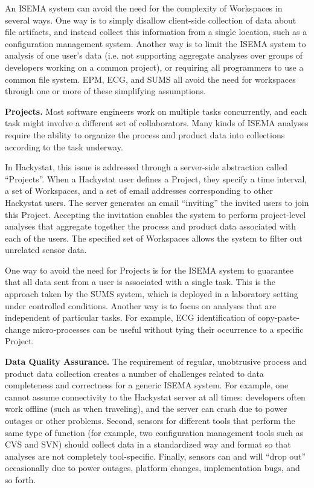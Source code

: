 \documentclass[10pt,twocolumn]{article}
\begin{document}
An ISEMA system can avoid the need for the complexity of Workspaces in
several ways.  One way is to simply disallow client-side collection of data
about file artifacts, and instead collect this information from a single
location, such as a configuration management system.  Another way
is to limit the ISEMA system to analysis of one user's data (i.e. not
supporting aggregate analyses over groups of developers working on a common
project), or requiring all programmers to use a common file system. EPM, 
ECG, and SUMS all avoid the need for workspaces through one or more of these 
simplifying assumptions.

{\bf Projects.} Most software engineers work on multiple tasks
concurrently, and each task might involve a different set of collaborators. 
Many kinds of ISEMA analyses require the ability to organize the process
and product data into collections according to the task underway.  

In Hackystat, this issue is addressed through a server-side abstraction
called ``Projects''.  When a Hackystat user defines a Project, they specify
a time interval, a set of Workspaces, and a set of email addresses
corresponding to other Hackystat users.  The server generates an email
``inviting'' the invited users to join this Project. Accepting
the invitation enables the system to perform project-level analyses that
aggregate together the process and product data associated with each of the
users. The specified set of Workspaces allows the system to filter out 
unrelated sensor data. 

One way to avoid the need for Projects is for the ISEMA system to guarantee
that all data sent from a user is associated with a single task. This is
the approach taken by the SUMS system, which is deployed in a laboratory
setting under controlled conditions. Another way is to focus on analyses
that are independent of particular tasks. For example, ECG identification
of copy-paste-change micro-processes can be useful without tying their
occurrence to a specific Project.

{\bf Data Quality Assurance.} The requirement of regular, unobtrusive
process and product data collection creates a number of challenges related
to data completeness and correctness for a generic ISEMA system.  For
example, one cannot assume connectivity to the Hackystat server at
all times: developers often work offline (such as when traveling), and the
server can crash due to power outages or other problems.  Second, sensors
for different tools that perform the same type of function (for example,
two configuration management tools such as CVS and SVN) should collect data
in a standardized way and format so that analyses are not completely
tool-specific. Finally, sensors can and will ``drop out'' occasionally due
to power outages, platform changes, implementation bugs, and so forth.
\end{document}
